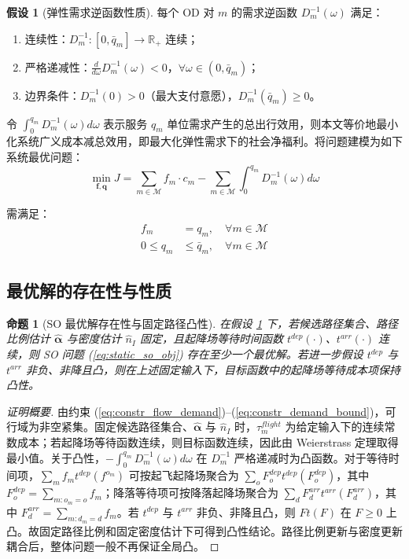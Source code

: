 \documentclass[a4paper,12pt]{article}
\theoremstyle{plain}
\newtheorem{proposition}[theorem]{命题}
\theoremstyle{definition}
\newtheorem{assumption}[theorem]{假设}
\theoremstyle{remark}
\begin{document}
\begin{assumption}[弹性需求逆函数性质]\label{asm:demand_inverse}
每个 OD 对 $m$ 的需求逆函数 $D_m^{-1}(\omega)$ 满足：
\begin{enumerate}
    \item 连续性：$D_m^{-1}: [0, \bar{q}_m] \to \mathbb{R}_+$ 连续；
    \item 严格递减性：$\frac{d}{d\omega}D_m^{-1}(\omega) < 0$，$\forall \omega \in (0, \bar{q}_m)$；
    \item 边界条件：$D_m^{-1}(0) > 0$（最大支付意愿），$D_m^{-1}(\bar{q}_m) \ge 0$。
\end{enumerate}
\end{assumption}

令 $\int_0^{q_m}D_m^{-1}(\omega)d\omega$ 表示服务 $q_m$ 单位需求产生的总出行效用，则本文等价地最小化系统广义成本减总效用，即最大化弹性需求下的社会净福利。将问题建模为如下系统最优问题：
\begin{equation} \label{eq:static_so_obj}
    \min_{\bm{f}, \bm{q}} J = \sum_{m \in \mathcal{M}} f_m \cdot c_m - \sum_{m \in \mathcal{M}} \int_{0}^{q_m} D_m^{-1}(\omega) d\omega
\end{equation}

需满足：
\begin{align}
    f_m &= q_m, \quad \forall m \in \mathcal{M} \label{eq:constr_flow_demand}\\
    0 \le q_m &\le \bar{q}_m, \quad \forall m \in \mathcal{M} \label{eq:constr_demand_bound}
\end{align}

\subsection{最优解的存在性与性质}

\begin{proposition}[SO 最优解存在性与固定路径凸性]\label{prop:so_convexity}
在假设 \ref{asm:demand_inverse} 下，若候选路径集合、路径比例估计 $\widehat{\bm\alpha}$ 与密度估计 $\hat n_I$ 固定，且起降场等待时间函数 $t^{dep}(\cdot)$、$t^{arr}(\cdot)$ 连续，则 SO 问题 (\ref{eq:static_so_obj}) 存在至少一个最优解。若进一步假设 $t^{dep}$ 与 $t^{arr}$ 非负、非降且凸，则在上述固定输入下，目标函数中的起降场等待成本项保持凸性。
\end{proposition}

\begin{proof}[证明概要]
由约束 (\ref{eq:constr_flow_demand})--(\ref{eq:constr_demand_bound})，可行域为非空紧集。固定候选路径集合、$\widehat{\bm\alpha}$ 与 $\hat n_I$ 时，$\tau_m^{flight}$ 为给定输入下的连续常数成本；若起降场等待函数连续，则目标函数连续，因此由 Weierstrass 定理取得最小值。关于凸性，$-\int_0^{q_m}D_m^{-1}(\omega)d\omega$ 在 $D_m^{-1}$ 严格递减时为凸函数。对于等待时间项，$\sum_m f_m t^{dep}(f^{o_m})$ 可按起飞起降场聚合为 $\sum_o F_o^{dep} t^{dep}(F_o^{dep})$，其中 $F_o^{dep}=\sum_{m:o_m=o}f_m$；降落等待项可按降落起降场聚合为 $\sum_d F_d^{arr} t^{arr}(F_d^{arr})$，其中 $F_d^{arr}=\sum_{m:d_m=d}f_m$。若 $t^{dep}$ 与 $t^{arr}$ 非负、非降且凸，则 $F t(F)$ 在 $F\ge 0$ 上凸。故固定路径比例和固定密度估计下可得到凸性结论。路径比例更新与密度更新耦合后，整体问题一般不再保证全局凸。
\end{proof}
\end{document}
